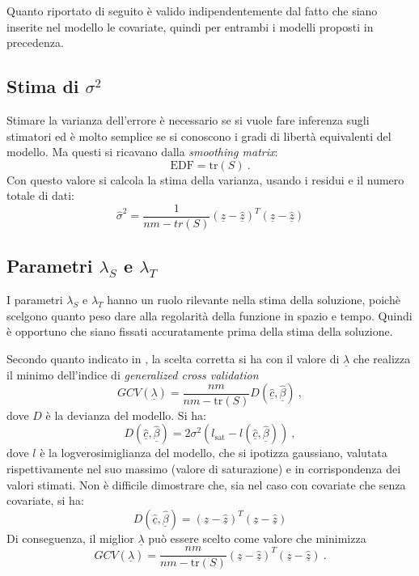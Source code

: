 \documentclass[a4paper,11pt,twoside,openright]{book}							%
\begin{document}
Quanto riportato di seguito è valido indipendentemente dal fatto che siano inserite nel modello le covariate, quindi per entrambi i modelli proposti in precedenza.

\subsection{Stima di $\sigma^2$}
Stimare la varianza dell'errore è necessario se si vuole fare inferenza sugli stimatori ed è molto semplice se si conoscono i gradi di libertà equivalenti del modello. Ma questi si ricavano dalla \textit{smoothing matrix}:
$$
\mathrm{EDF}=\mathrm{tr}(S) \ .
$$
Con questo valore si calcola la stima della varianza, usando i residui e il numero totale di dati:
$$
\hat{\sigma}^2=\frac{1}{nm-tr(S)}(\underline z - \hat  {\underline z})^T(\underline z - \hat  {\underline z})
$$

\subsection{Parametri $\lambda_S$ e $\lambda_T$}
I parametri $\lambda_S$ e $\lambda_T$ hanno un ruolo rilevante nella stima della soluzione, poichè scelgono quanto peso dare alla regolarità della funzione in spazio e tempo. Quindi è opportuno che siano fissati accuratamente prima della stima della soluzione.

Secondo quanto indicato in \cite{art:marra}, la scelta corretta si ha con il valore di $\underline \lambda$ che realizza il minimo dell'indice di \textit{generalized cross validation}
$$
GCV(\underline \lambda) =\frac{nm}{nm-\text{tr}(S)}  D(\hat  {\underline c},\hat  {\underline \beta}) \ ,
$$
dove $D$ è la devianza del modello. Si ha:
$$
D(\hat  {\underline c},\hat  {\underline \beta})=2\sigma^2(l_{\mathrm{sat}}-l(\hat  {\underline c},\hat  {\underline \beta})) \ ,
$$
dove $l$ è la logverosimiglianza del modello, che si ipotizza gaussiano, valutata rispettivamente nel suo massimo (valore di saturazione) e in corrispondenza dei valori stimati. Non è difficile dimostrare che, sia nel caso con covariate che senza covariate, si ha: 
$$
D(\hat  {\underline c},\hat  {\underline \beta}) = (\underline z - \hat  {\underline z})^T(\underline z - \hat  {\underline z})
$$
Di conseguenza, il miglior $\underline \lambda$ può essere scelto come valore che minimizza
$$
GCV(\underline \lambda) =\frac{nm}{nm-\text{tr}(S)}  (\underline z - \hat  {\underline z})^T(\underline z - \hat  {\underline z}) \ .
$$
\end{document}
